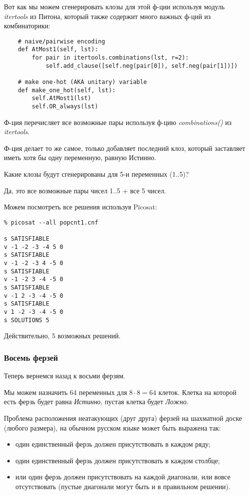 Вот как мы можем сгенерировать клозы для этой ф-ции используя модуль \textit{itertools} из Питона,
который также содержит много важных ф-ций из комбинаторики:

\begin{lstlisting}
    # naive/pairwise encoding   
    def AtMost1(self, lst):
        for pair in itertools.combinations(lst, r=2):
            self.add_clause([self.neg(pair[0]), self.neg(pair[1])])
       
    # make one-hot (AKA unitary) variable
    def make_one_hot(self, lst):
        self.AtMost1(lst)
        self.OR_always(lst)
\end{lstlisting}

Ф-ция  перечисляет все возможные пары используя ф-цию \textit{combinations()} из
\textit{itertools}.

Ф-ция  делает то же самое, только добавляет последний клоз, который заставляет иметь хотя бы одну
переменную, равную Истинно.

Какие клозы будут сгенерированы для 5-и переменных (1..5)?



Да, это все возможные пары чисел 1..5 + все 5 чисел.

Можем посмотреть все решения используя Picosat:

\begin{lstlisting}
% picosat --all popcnt1.cnf

s SATISFIABLE
v -1 -2 -3 -4 5 0
s SATISFIABLE
v -1 -2 -3 4 -5 0
s SATISFIABLE
v -1 -2 3 -4 -5 0
s SATISFIABLE
v -1 2 -3 -4 -5 0
s SATISFIABLE
v 1 -2 -3 -4 -5 0
s SOLUTIONS 5
\end{lstlisting}

Действительно, 5 возможных решений.

\subsubsection{Восемь ферзей}

Теперь вернемся назад к восьми ферзям.

Мы можем назначить 64 переменных для $8 \cdot 8=64$ клеток.
Клетка на которой есть ферзь будет равна \textit{Истинно}, пустая клетка будет \textit{Ложно}.

Проблема расположения неатакующих (друг друга) ферзей на шахматной доске (любого размера), на обычном русском
языке может быть выражена так:

\begin{itemize}
\item один единственный ферзь должен присутствовать в каждом ряду;

\item один единственный ферзь должен присутствовать в каждом столбце;

\item или один ферзь должен присутствовать на каждой диагонали, или вовсе отсутствовать (пустые диагонали могут быть
и в правильном решении).
\end{itemize}

